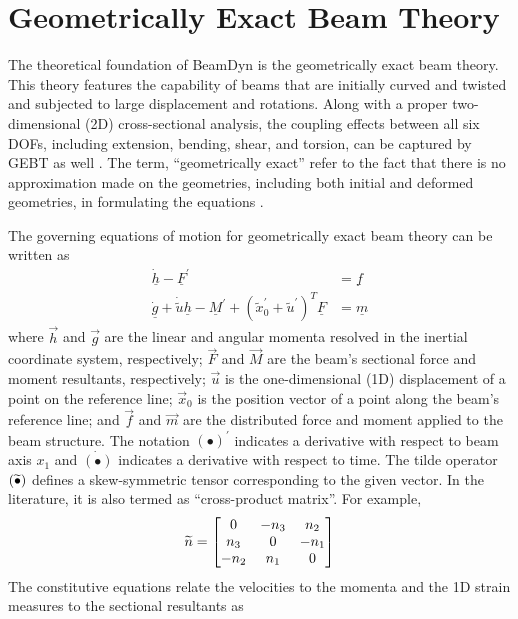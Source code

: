 \section{Geometrically Exact Beam Theory}
The theoretical foundation of BeamDyn is the geometrically exact beam theory. 
This theory features the capability of beams that are initially curved and twisted and subjected to large displacement and rotations. 
Along with a proper two-dimensional (2D) cross-sectional analysis, the coupling effects between all six DOFs, including extension, bending, shear, and torsion, can be captured by GEBT as well . 
The term, ``geometrically exact'' refer to the fact that there is no approximation made on the geometries, including both initial and deformed geometries, in formulating the equations \cite{HodgesBeamBook}.    

 The governing equations of motion for geometrically exact beam theory can be written as \cite{Bauchau:2010}
\begin{align}
	\label{GovernGEBT-1}
	\dot{\underline{h}} - \underline{F}^\prime &= \underline{f} \\
	\label{GovernGEBT-2}
	\dot{\underline{g}} + \dot{\tilde{u}} \underline{h} - \underline{M}^\prime + (\tilde{x}_0^\prime + \tilde{u}^\prime)^T \underline{F} &= \underline{m}
\end{align}
where $\vec{h}$ and $\vec{g}$ are the linear and angular momenta resolved in the inertial coordinate system, respectively; $\vec{F}$ and $\vec{M}$ are the beam's sectional force and moment resultants, respectively; $\vec{u}$ is the one-dimensional (1D) displacement of a point on the reference line; $\vec{x}_0$ is the position vector of a point along the beam's reference line;  and $\vec{f}$ and $\vec{m}$ are the distributed force and moment applied to the beam structure.  
The notation $(\bullet)^\prime$ indicates a derivative with respect to beam axis $x_1$ and $\dot{(\bullet)}$ indicates a derivative with respect to time. 
The tilde operator $(\widetilde{\bullet})$ defines a skew-symmetric tensor corresponding to the given vector. 
In the literature, it is also termed as ``cross-product matrix''.
For example,
\[
	\widetilde{n} = 
	     		\begin{bmatrix}
			0 & -n_3 & n_2 \\
			n_3 & 0 & -n_1 \\
			-n_2 & n_1 & 0\\
			\end{bmatrix}	
\]
The constitutive equations relate the velocities to the momenta and the 1D strain measures to the sectional resultants as
